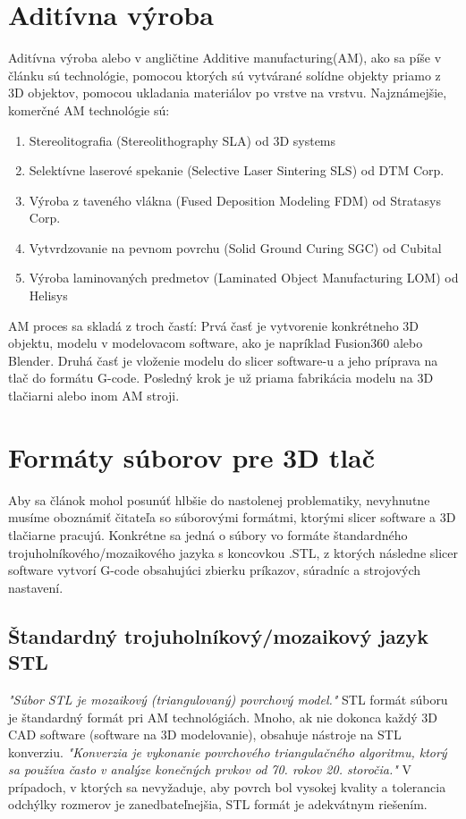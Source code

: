 \documentclass[10pt,twoside,slovak,a4paper]{article}
\begin{document}
\section{Aditívna výroba}\label{AM}
    Aditívna výroba alebo v angličtine Additive manufacturing(AM), ako sa píše v článku \cite{inproceedings} sú technológie, pomocou ktorých sú vytvárané solídne objekty priamo z 3D objektov, pomocou ukladania materiálov  po vrstve na vrstvu. 
    Najznámejšie, komerčné AM technológie sú:
\newpage
\begin{enumerate}
    \item Stereolitografia (Stereolithography SLA) od 3D systems
    \item Selektívne laserové spekanie  (Selective Laser Sintering SLS) od DTM Corp.
    \item Výroba z taveného vlákna (Fused Deposition Modeling FDM) od Stratasys  Corp.
    \item Vytvrdzovanie na pevnom povrchu  (Solid Ground Curing SGC)  od Cubital
    \item Výroba laminovaných predmetov (Laminated Object Manufacturing LOM) od Helisys
\end{enumerate}
    \cite{6757836} AM proces sa skladá z troch častí: Prvá časť je vytvorenie konkrétneho 3D objektu, modelu v modelovacom software, ako je napríklad Fusion360 alebo Blender. Druhá časť je vloženie modelu do slicer software-u a jeho príprava na tlač do formátu G-code. Posledný krok je už priama fabrikácia modelu na 3D tlačiarni alebo inom AM stroji.

\section{Formáty súborov pre 3D tlač}
    Aby sa článok mohol posunúť hlbšie do nastolenej problematiky, nevyhnutne musíme oboznámiť čitateľa so súborovými formátmi, ktorými slicer software a 3D tlačiarne pracujú. Konkrétne sa jedná o súbory vo formáte štandardného trojuholníkového/mozaikového jazyka s koncovkou .STL, z ktorých následne slicer software vytvorí G-code obsahujúci zbierku príkazov, súradníc a strojových nastavení.

\subsection{Štandardný trojuholníkový/mozaikový jazyk STL}\label{formaty:STL}
    \cite{6757836} \emph{"Súbor STL je mozaikový (triangulovaný) povrchový model."}
    \cite{inproceedings} STL formát súboru je štandardný formát pri AM technológiách. Mnoho, ak nie dokonca každý 3D CAD software (software na 3D modelovanie), obsahuje nástroje na STL konverziu.
    \emph{"Konverzia je vykonanie povrchového triangulačného algoritmu, ktorý sa používa často v analýze konečných prvkov od 70. rokov 20. storočia."}
    V prípadoch, v ktorých sa nevyžaduje, aby povrch bol vysokej kvality a tolerancia odchýlky rozmerov je zanedbateľnejšia, STL formát je adekvátnym riešením.
\end{document}
